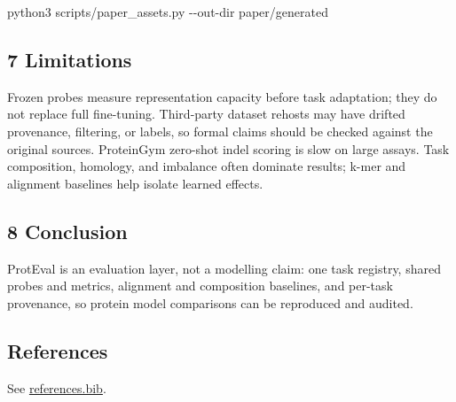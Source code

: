 \documentclass[
]{article}
\newenvironment{Shaded}{}{}
\newcommand{\AttributeTok}[1]{\textcolor[rgb]{0.49,0.56,0.16}{#1}}
\newcommand{\ExtensionTok}[1]{#1}
\newcommand{\NormalTok}[1]{#1}
\begin{document}
\begin{Shaded}
\begin{Highlighting}[]
\ExtensionTok{python3}\NormalTok{ scripts/paper\_assets.py }\AttributeTok{{-}{-}out{-}dir}\NormalTok{ paper/generated}
\end{Highlighting}
\end{Shaded}

\subsection{7 Limitations}\label{limitations}

Frozen probes measure representation capacity before task adaptation;
they do not replace full fine-tuning. Third-party dataset rehosts may
have drifted provenance, filtering, or labels, so formal claims should
be checked against the original sources. ProteinGym zero-shot indel
scoring is slow on large assays. Task composition, homology, and
imbalance often dominate results; k-mer and alignment baselines help
isolate learned effects.

\subsection{8 Conclusion}\label{conclusion}

ProtEval is an evaluation layer, not a modelling claim: one task
registry, shared probes and metrics, alignment and composition baselines,
and per-task provenance, so protein model comparisons can be reproduced
and audited.

\subsection{References}\label{references}

See \url{references.bib}.

\printbibliography
\end{document}
